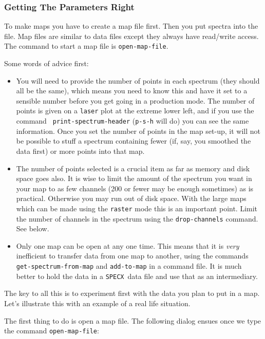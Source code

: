 \documentclass[11pt,twoside]{article}
\newcommand{\SPECX}{{\tt SPECX}}
\begin{document}
\subsubsection{Getting The Parameters Right}
\label{sec:specx_13.1}
To make maps you have to create a map file first.  Then you put
spectra into the file.  Map files are similar to data files except
they always have read/write access.  The command to start a map file
is {\tt open-map-file}.

Some words of advice first:
\begin{itemize}
\item
You will need to provide the number of points in each spectrum (they
should all be the same), which means you need to know this and have it
set to a sensible number before you get going in a production
mode. The number of points is given on a {\tt laser} plot at the
extreme lower left, and if you use the command {\tt
print-spectrum-header} ({\tt{p-s-h}} will do) you can see the same
information. Once you set the number of points in the map set-up, it
will not be possible to stuff a spectrum containing fewer (if, say,
you smoothed the data first) or more points into that map.
\item
The number of points selected is a crucial item as far as memory and
disk space goes also. It is wise to limit the amount of the spectrum
you want in your map to as few channels (200 or fewer may be enough
sometimes) as is practical. Otherwise you may run out of disk
space. With the large maps which can be made using the {\tt raster}
mode this is an important point. Limit the number of channels in the
spectrum using the {\tt drop-channels} command. See below.
\item
Only one map can be open at any one time. This means that it is {\it
very} inefficient to transfer data from one map to another, using the
commands
\verb|get-spectrum-from-map| and {\tt add-to-map} in a command file. It is
much better to hold the data in a \SPECX\ data file and use that as an
intermediary. 
\end{itemize}

The key to all this is to experiment first with the data you plan to
put in a map. Let's illustrate this with an example of a real life
situation.

The first thing to do is open a map file. The following dialog ensues once we 
type the command {\tt open-map-file}: 
\end{document}
